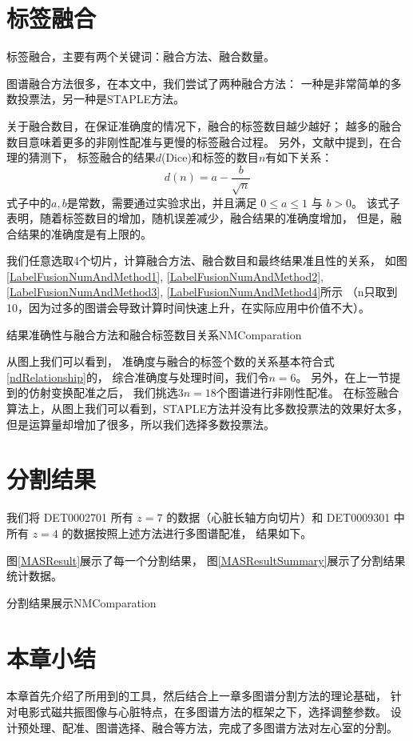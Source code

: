 \section{标签融合}

标签融合，主要有两个关键词：融合方法、融合数量。

图谱融合方法很多，在本文中，我们尝试了两种融合方法：
一种是非常简单的多数投票法，另一种是STAPLE方法。

关于融合数目，在保证准确度的情况下，融合的标签数目越少越好；
越多的融合数目意味着更多的非刚性配准与更慢的标签融合过程。
另外，文献\cite{HeckemannMultiClassifier2006}中提到，在合理的猜测下，
标签融合的结果$d$(Dice)和标签的数目$n$有如下关系：
\begin{equation}\label{ndRelationship}
  d(n)=a-\frac{b}{\sqrt{n}}
\end{equation}
式子中的$a,b$是常数，需要通过实验求出，并且满足 $0\le a\le 1$ 与 $b>0$。
该式子表明，随着标签数目的增加，随机误差减少，融合结果的准确度增加，
但是，融合结果的准确度是有上限的。

我们任意选取4个切片，计算融合方法、融合数目和最终结果准且性的关系，
如图\ref{LabelFusionNumAndMethod1}, \ref{LabelFusionNumAndMethod2},
\ref{LabelFusionNumAndMethod3}, \ref{LabelFusionNumAndMethod4}所示
（n只取到10，因为过多的图谱会导致计算时间快速上升，在实际应用中价值不大）。
\begin{pics}[htpb]{结果准确性与融合方法和融合标签数目关系}{NMComparation}
\end{pics}

从图上我们可以看到，
准确度与融合的标签个数的关系基本符合式\ref{ndRelationship}的，
综合准确度与处理时间，我们令$n=6$。
另外，在上一节提到的仿射变换配准之后，
我们挑选$3n=18$个图谱进行非刚性配准。
在标签融合算法上，从图上我们可以看到，STAPLE方法并没有比多数投票法的效果好太多，
但是运算量却增加了很多，所以我们选择多数投票法。

\section{分割结果}
我们将 DET0002701 所有 $z=7$ 的数据（心脏长轴方向切片）和 
DET0009301 中所有 $z=4$ 的数据按照上述方法进行多图谱配准，
结果如下。

图\ref{MASResult}展示了每一个分割结果，
图\ref{MASResultSummary}展示了分割结果统计数据。
\begin{pics}[htpb]{分割结果展示}{NMComparation}
\end{pics}

\section{本章小结}
本章首先介绍了所用到的工具，然后结合上一章多图谱分割方法的理论基础，
针对电影式磁共振图像与心脏特点，在多图谱方法的框架之下，选择调整参数。
设计预处理、配准、图谱选择、融合等方法，完成了多图谱方法对左心室的分割。
